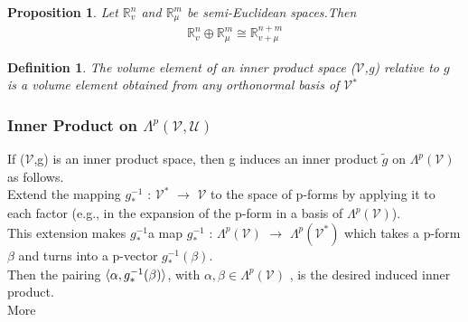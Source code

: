 \documentclass[12pt,a4paper]{article}
\newtheorem{defn}[thm]{Definition}
\newtheorem{prop}{Proposition}
\begin{document}
\begin{prop}
Let $\mathbb{R}^n_v$ and $\mathbb{R}^m_\mu$ be semi-Euclidean spaces.Then
\begin{eqnarray*}
\mathbb{R}^n_v \oplus \mathbb{R}^m_\mu \cong \mathbb{R}^{n+m}_{v + \mu}
\end{eqnarray*}
\end{prop}
\begin{defn}
The volume element of an inner product space ($\mathcal{V}$,g)
relative to $g$ is a volume element obtained from any orthonormal basis
of $\mathcal{V}$$^*$
\end{defn}
\subsubsection{Inner Product on $\Lambda^{p}(\mathcal{V}, \mathcal{U})$}
If ($\mathcal{V}$,g) is an inner product space, then g induces an inner product $\widetilde{g}$ on $\Lambda^{p}(\mathcal{V})$ as follows. \\Extend the mapping $g_*^{-1}$ : $\mathcal{V}^*$ $\to$ $\mathcal{V}$ to the space of p-forms by applying it to each factor (e.g., in the expansion of the p-form in a
basis of $\Lambda^{p}(\mathcal{V})$).\\ This extension makes $g_*^{-1}$a map $g_*^{-1}$ : $\Lambda^{p}(\mathcal{V})$ $\to$ $\Lambda^{p}(\mathcal{V}^*)$ which takes a p-form $\beta$ and turns into a p-vector $g_*^{-1} (\beta)$. \\Then the pairing $\braket{\alpha, g_*^{-1}(\beta)}$, with $\alpha, \beta \in \Lambda^{p}(\mathcal{V})$ , is the desired induced inner product. \\More
\end{document}
